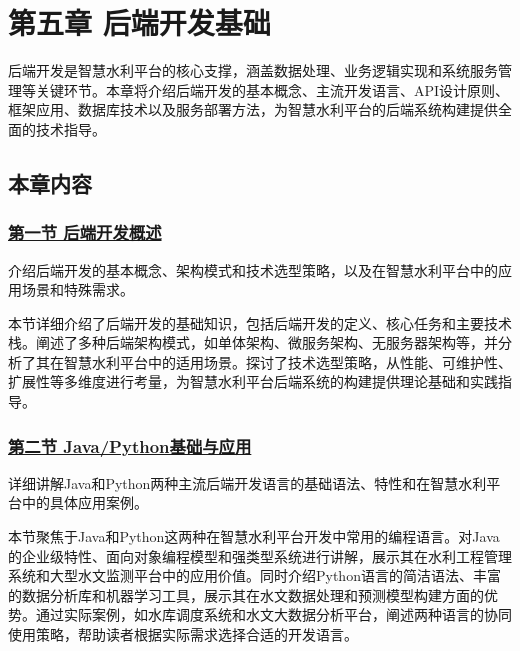 \section{第五章
后端开发基础}\label{ux7b2cux4e94ux7ae0-ux540eux7aefux5f00ux53d1ux57faux7840}

后端开发是智慧水利平台的核心支撑，涵盖数据处理、业务逻辑实现和系统服务管理等关键环节。本章将介绍后端开发的基本概念、主流开发语言、API设计原则、框架应用、数据库技术以及服务部署方法，为智慧水利平台的后端系统构建提供全面的技术指导。

\subsection{本章内容}\label{ux672cux7ae0ux5185ux5bb9}

\subsubsection{\texorpdfstring{\href{section05-01.md}{第一节
后端开发概述}}{第一节 后端开发概述}}\label{ux7b2cux4e00ux8282-ux540eux7aefux5f00ux53d1ux6982ux8ff0}

介绍后端开发的基本概念、架构模式和技术选型策略，以及在智慧水利平台中的应用场景和特殊需求。

本节详细介绍了后端开发的基础知识，包括后端开发的定义、核心任务和主要技术栈。阐述了多种后端架构模式，如单体架构、微服务架构、无服务器架构等，并分析了其在智慧水利平台中的适用场景。探讨了技术选型策略，从性能、可维护性、扩展性等多维度进行考量，为智慧水利平台后端系统的构建提供理论基础和实践指导。

\subsubsection{\texorpdfstring{\href{section05-02.md}{第二节
Java/Python基础与应用}}{第二节 Java/Python基础与应用}}\label{ux7b2cux4e8cux8282-javapythonux57faux7840ux4e0eux5e94ux7528}

详细讲解Java和Python两种主流后端开发语言的基础语法、特性和在智慧水利平台中的具体应用案例。

本节聚焦于Java和Python这两种在智慧水利平台开发中常用的编程语言。对Java的企业级特性、面向对象编程模型和强类型系统进行讲解，展示其在水利工程管理系统和大型水文监测平台中的应用价值。同时介绍Python语言的简洁语法、丰富的数据分析库和机器学习工具，展示其在水文数据处理和预测模型构建方面的优势。通过实际案例，如水库调度系统和水文大数据分析平台，阐述两种语言的协同使用策略，帮助读者根据实际需求选择合适的开发语言。

